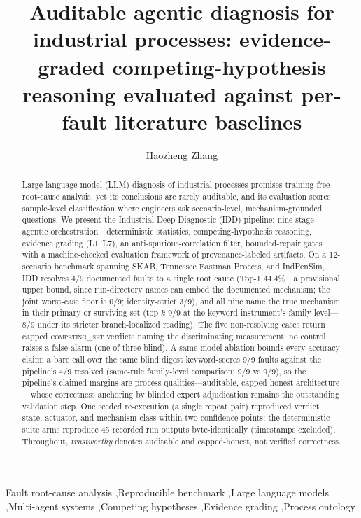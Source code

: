 \documentclass[preprint,10pt]{elsarticle}
\begin{document}
\title{Auditable agentic diagnosis for industrial processes: evidence-graded competing-hypothesis reasoning evaluated against per-fault literature baselines}

\author[ustc]{Haozheng Zhang}
\address[ustc]{Institute of Advanced Technology, University of Science and Technology of China, Hefei 230088, China}

\begin{frontmatter}
\begin{abstract}
Large language model (LLM) diagnosis of industrial processes promises training-free root-cause analysis, yet its conclusions are rarely auditable, and its evaluation scores sample-level classification where engineers ask scenario-level, mechanism-grounded questions. We present the Industrial Deep Diagnostic (IDD) pipeline: nine-stage agentic orchestration---deterministic statistics, competing-hypothesis reasoning, evidence grading (L1--L7), an anti-spurious-correlation filter, bounded-repair gates---with a machine-checked evaluation framework of provenance-labeled artifacts. On a 12-scenario benchmark spanning SKAB, Tennessee Eastman Process, and IndPenSim, IDD resolves 4/9 documented faults to a single root cause (Top-1 $44.4\%$---a provisional upper bound, since run-directory names can embed the documented mechanism; the joint worst-case floor is 0/9; identity-strict 3/9), and all nine name the true mechanism in their primary or surviving set (top-$k$ 9/9 at the keyword instrument's family level---8/9 under its stricter branch-localized reading). The five non-resolving cases return capped \mbox{\textsc{competing\_set}} verdicts naming the discriminating measurement; no control raises a false alarm (one of three blind). A same-model ablation bounds every accuracy claim: a bare call over the same blind digest keyword-scores 9/9 faults against the pipeline's 4/9 resolved (same-rule family-level comparison: 9/9 vs 9/9), so the pipeline's claimed margins are process qualities---auditable, capped-honest architecture---whose correctness anchoring by blinded expert adjudication remains the outstanding validation step. One seeded re-execution (a single repeat pair) reproduced verdict state, actuator, and mechanism class within two confidence points; the deterministic suite arms reproduce 45 recorded run outputs byte-identically (timestamps excluded). Throughout, \emph{trustworthy} denotes auditable and capped-honest, not verified correctness.
\end{abstract}

\begin{keyword}
Fault root-cause analysis \sep Reproducible benchmark \sep Large language models \sep Multi-agent systems \sep Competing hypotheses \sep Evidence grading \sep Process ontology
\end{keyword}

\end{frontmatter}
\end{document}

